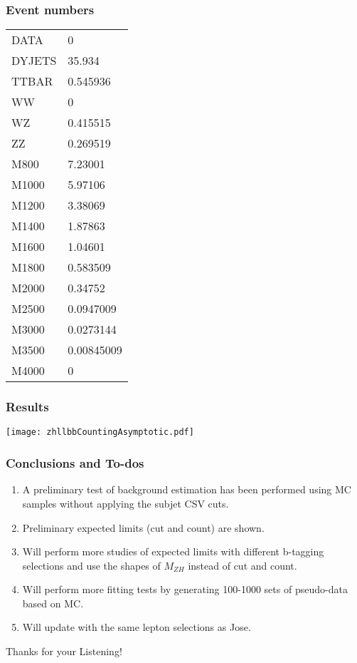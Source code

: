 \documentclass[7pt,aspectratio=1610]{beamer}
\begin{document}
\begin{frame}
  \frametitle{Event numbers}
  \justifying
  \begin{tiny}
    \begin{center}
      \begin{tabular}{ | l | l | }
        \hline
        DATA   & 0          \\
        DYJETS & 35.934     \\
        TTBAR  & 0.545936   \\
        WW     & 0          \\
        WZ     & 0.415515   \\
        ZZ     & 0.269519   \\
        M800   & 7.23001    \\
        M1000  & 5.97106    \\
        M1200  & 3.38069    \\
        M1400  & 1.87863    \\
        M1600  & 1.04601    \\
        M1800  & 0.583509   \\
        M2000  & 0.34752    \\
        M2500  & 0.0947009  \\
        M3000  & 0.0273144  \\
        M3500  & 0.00845009 \\
        M4000  & 0          \\
        \hline
      \end{tabular}
    \end{center}
  \end{tiny}
\end{frame}
\begin{frame}
  \frametitle{Results}
  \begin{center}
    \texttt{[image: zhllbbCountingAsymptotic.pdf]}
  \end{center}
\end{frame}
\begin{frame}
  \frametitle{Conclusions and To-dos}
  \justifying 
  \begin{footnotesize}
    \begin{enumerate}[1.]
      \setcounter{enumi}{0} %
    \item A preliminary test of background estimation has been performed using MC samples without applying the subjet CSV cuts.
    \item Preliminary expected limits (cut and count) are shown. 
    \item Will perform more studies of expected limits with different b-tagging selections and use the shapes of $M_{ZH}$ instead of cut and count.
    \item Will perform more fitting tests by generating 100-1000 sets of pseudo-data based on MC.
    \item Will update with the same lepton selections as Jose.
    \end{enumerate}
  \end{footnotesize}
\end{frame}
\begin{frame}
  \Huge{\centerline{Thanks for your Listening!}}
\end{frame}
\end{document}
